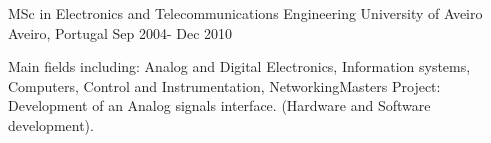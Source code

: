 

\begin{cventries}

  \cventry
    {MSc in Electronics and Telecommunications Engineering} %
    {University of Aveiro} %
    {Aveiro, Portugal} %
    {Sep 2004- Dec 2010} %
    {
      \begin{cvitems} %
       \item {Main fields including: Analog and Digital Electronics, Information systems, Computers, Control and Instrumentation, NetworkingMasters Project: Development of an Analog signals interface. (Hardware and Software development).}
      \end{cvitems}
    }

\end{cventries}
